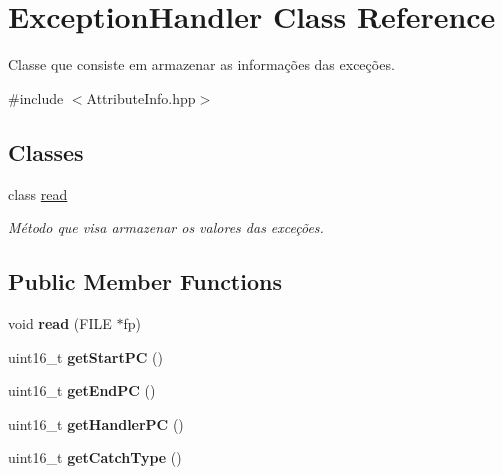 \hypertarget{classExceptionHandler}{}\section{Exception\+Handler Class Reference}
\label{classExceptionHandler}


Classe que consiste em armazenar as informações das exceções.  




{\ttfamily \#include $<$Attribute\+Info.\+hpp$>$}

\subsection*{Classes}
\begin{DoxyCompactItemize}
\item 
class \hyperlink{classExceptionHandler_1_1read}{read}
\begin{DoxyCompactList}\small\item\em Método que visa armazenar os valores das exceções. \end{DoxyCompactList}\end{DoxyCompactItemize}
\subsection*{Public Member Functions}
\begin{DoxyCompactItemize}
\item 
void {\bfseries read} (F\+I\+LE $\ast$fp)\hypertarget{classExceptionHandler_a9136c36e6dda68b55ad760623a4af5fc}{}\label{classExceptionHandler_a9136c36e6dda68b55ad760623a4af5fc}

\item 
uint16\+\_\+t {\bfseries get\+Start\+PC} ()\hypertarget{classExceptionHandler_a25e0e210e6638a16f2d2ae43cb9e63b2}{}\label{classExceptionHandler_a25e0e210e6638a16f2d2ae43cb9e63b2}

\item 
uint16\+\_\+t {\bfseries get\+End\+PC} ()\hypertarget{classExceptionHandler_abb77266bac3ca92769525b3a19ce07cd}{}\label{classExceptionHandler_abb77266bac3ca92769525b3a19ce07cd}

\item 
uint16\+\_\+t {\bfseries get\+Handler\+PC} ()\hypertarget{classExceptionHandler_a5288882b315614cd18ff3935d3b7deb7}{}\label{classExceptionHandler_a5288882b315614cd18ff3935d3b7deb7}

\item 
uint16\+\_\+t {\bfseries get\+Catch\+Type} ()\hypertarget{classExceptionHandler_a841a52c00770c5967c578918d3dfbde8}{}\label{classExceptionHandler_a841a52c00770c5967c578918d3dfbde8}

\end{DoxyCompactItemize}


